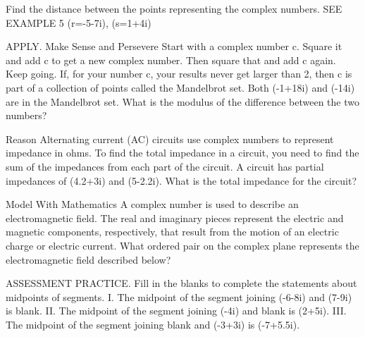 \documentclass{article}
\newenvironment{practice}[2]{}{}        %
\newcommand{\answer}[1]{}               %
\newcommand{\placeholder}[2]{}          %
\begin{document}
\begin{practice}{30}{1}
Find the distance between the points representing the complex numbers. SEE EXAMPLE 5
(r=-5-7i), (s=1+4i)
\answer{(\sqrt{157}\approx12.53)}
\end{practice}
\begin{practice}{31}{2}
APPLY. Make Sense and Persevere Start with a complex number c. Square it and add c to get a new complex number. Then square that and add c again. Keep going. If, for your number c, your results never get larger than 2, then c is part of a collection of points called the Mandelbrot set. Both (-1+\frac18i) and (-\frac14i) are in the Mandelbrot set. What is the modulus of the difference between the two numbers?
\placeholder{graph}{Mandelbrot set picture on salmon background with yellow and green boundary and cyan interior. Black axes Real horizontal from -2 to1 ticks -2,-1,0,1, Imaginary vertical ticks -1 and1, no arrows/grid. Black points at (-1,1/8),(1/8,-1/4) with white callout labels. Symmetric blue cardioid-like main region and left circular lobe.}
\answer{(\frac{3\sqrt{10}}8\approx1.19)}
\end{practice}
\begin{practice}{32}{2}
Reason Alternating current (AC) circuits use complex numbers to represent impedance in ohms. To find the total impedance in a circuit, you need to find the sum of the impedances from each part of the circuit. A circuit has partial impedances of (4.2+3i) and (5-2.2i). What is the total impedance for the circuit?
\answer{(9.2+0.8i) ohms}
\end{practice}
\begin{practice}{33}{2}
Model With Mathematics A complex number is used to describe an electromagnetic field. The real and imaginary pieces represent the electric and magnetic components, respectively, that result from the motion of an electric charge or electric current. What ordered pair on the complex plane represents the electromagnetic field described below?
\placeholder{diagram}{Orange wire coil horizontal with ends pointing down, surrounded by pale blue closed curved arrow loops representing magnetic field. White callouts Magnetic field: -14 above top loop and Electric current 9 pointing to coil.}
\answer{(9,-14)}
\end{practice}
\begin{practice}{34}{1}
ASSESSMENT PRACTICE. Fill in the blanks to complete the statements about midpoints of segments.
I. The midpoint of the segment joining (-6-8i) and (7-9i) is blank.
II. The midpoint of the segment joining (-4i) and blank is (2+5i).
III. The midpoint of the segment joining blank and (-3+3i) is (-7+5.5i).
\answer{I. (0.5-8.5i) II. (4+14i) III. (-11+8i)}
\end{practice}
\end{document}
